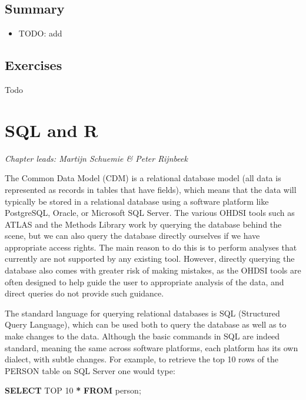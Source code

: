 \documentclass[11pt]{book}
\newenvironment{Shaded}{\begin{snugshade}}{\end{snugshade}}
\newcommand{\DecValTok}[1]{\textcolor[rgb]{0.00,0.00,0.81}{#1}}
\newcommand{\KeywordTok}[1]{\textcolor[rgb]{0.13,0.29,0.53}{\textbf{#1}}}
\newcommand{\NormalTok}[1]{#1}
\newcommand{\OperatorTok}[1]{\textcolor[rgb]{0.81,0.36,0.00}{\textbf{#1}}}
\providecommand{\tightlist}{%
  \setlength{\itemsep}{0pt}\setlength{\parskip}{0pt}}
\theoremstyle{definition}
\theoremstyle{definition}
\theoremstyle{definition}
\theoremstyle{remark}
\let\BeginKnitrBlock\begin \let\EndKnitrBlock\end
\begin{document}
\hypertarget{summary-4}{%
\section{Summary}\label{summary-4}}

\BeginKnitrBlock{rmdsummary}
\begin{itemize}
\tightlist
\item
  TODO: add
\end{itemize}
\EndKnitrBlock{rmdsummary}

\hypertarget{exercises-1}{%
\section{Exercises}\label{exercises-1}}

Todo

\hypertarget{SqlAndR}{%
\chapter{SQL and R}\label{SqlAndR}}

\emph{Chapter leads: Martijn Schuemie \& Peter Rijnbeek}

The Common Data Model (CDM) is a relational database model (all data is represented as records in tables that have fields), which means that the data will typically be stored in a relational database using a software platform like PostgreSQL, Oracle, or Microsoft SQL Server. The various OHDSI tools such as ATLAS and the Methods Library work by querying the database behind the scene, but we can also query the database directly ourselves if we have appropriate access rights. The main reason to do this is to perform analyses that currently are not supported by any existing tool. However, directly querying the database also comes with greater risk of making mistakes, as the OHDSI tools are often designed to help guide the user to appropriate analysis of the data, and direct queries do not provide such guidance.

The standard language for querying relational databases is SQL (Structured Query Language), which can be used both to query the database as well as to make changes to the data. Although the basic commands in SQL are indeed standard, meaning the same across software platforms, each platform has its own dialect, with subtle changes. For example, to retrieve the top 10 rows of the PERSON table on SQL Server one would type:

\begin{Shaded}
\begin{Highlighting}[]
\KeywordTok{SELECT}\NormalTok{ TOP }\DecValTok{10} \OperatorTok{*} \KeywordTok{FROM}\NormalTok{ person;}
\end{Highlighting}
\end{Shaded}
\end{document}

